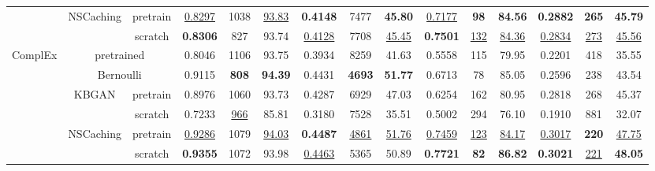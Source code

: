 \documentclass[conference]{IEEEtran}
\begin{document}
\begin{table*}[ht]
\begin{tabular}{c|c c|c c c|ccc|ccc|ccc}
	                          & NSCaching & pretrain & \underline{0.8297} & 1038            & \underline{93.83}      &  \textbf{0.4148}   &       7477       &     \textbf{45.80}     & \underline{0.7177} &    \textbf{98}    &     \textbf{84.56}      &  \textbf{0.2882}   &  \textbf{265}   &     \textbf{45.79}     \\
	                          &                 & scratch  &  \textbf{0.8306}   & 827             & 93.74                  & \underline{0.4128} &       7708       &   \underline{45.45}    & {\textbf{0.7501}}  & \underline{{132}} &    \underline{84.36}    & \underline{0.2834} & \underline{273} &   \underline{45.56}    \\ \hline
	\multirow{6}{*}{ComplEx}  &   \multicolumn{2}{c|}{pretrained}    &       0.8046       & 1106            & 93.75                  &       0.3934       &       8259       &         41.63          &       0.5558       &        115        &          79.95          &       0.2201       &       418       &         35.55          \\
	                          &    \multicolumn{2}{c|}{Bernoulli}    &       0.9115       & \textbf{808}    & \textbf{94.39}         &       0.4431       &  \textbf{4693}   &     \textbf{51.77}     &       0.6713       &       {78}        &         {85.05}         &       0.2596       &       238       &         43.54          \\
	                          &      KBGAN      & pretrain &       0.8976       & 1060            & 93.73                  &       0.4287       &       6929       &         47.03          &       0.6254       &        162        &          80.95          &       0.2818       &       268       &         45.37          \\
	                          &                 & scratch  &       0.7233       & \underline{966} & 85.81                  &       0.3180       &       7528       &         35.51          &       0.5002       &        294        &          76.10          &       0.1910       &       881       &         32.07          \\
	                          & NSCaching & pretrain & \underline{0.9286} & 1079            & \underline{94.03}      &  \textbf{0.4487}   & \underline{4861} &   \underline{51.76}    & \underline{0.7459} &  \underline{123}  &    \underline{84.17}    & \underline{0.3017} &  \textbf{220}   &   \underline{47.75}    \\
	                          &                 & scratch  &  \textbf{0.9355}   & 1072            & 93.98                  & \underline{0.4463} &       5365       &         50.89          &  \textbf{0.7721}   &    \textbf{82}    &     \textbf{86.82}      &  \textbf{0.3021}   & \underline{221} &     \textbf{48.05}     \\ \hline
\end{tabular}
\end{table*}
\end{document}
